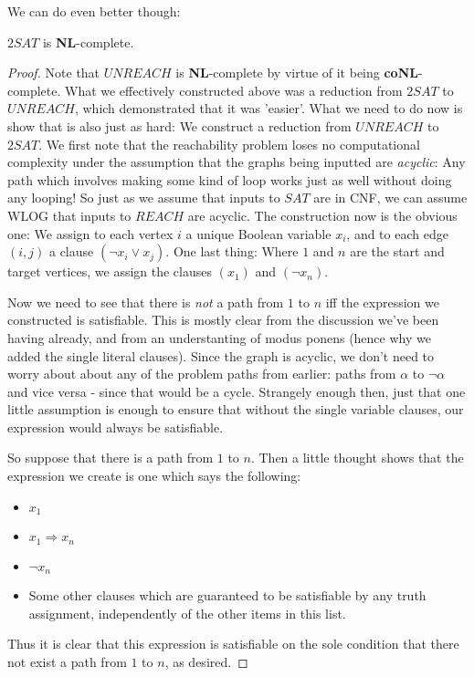 We can do even better though:
\begin{theorem}
    $2SAT$ is \textbf{NL}-complete.
\end{theorem}
\begin{proof}
    Note that $UNREACH$ is \textbf{NL}-complete by virtue of it being \textbf{coNL}-complete. What we effectively constructed above was a reduction from $2SAT$ to $UNREACH$, which demonstrated that it was 'easier'. What we need to do now is show that is also just as hard: We construct a reduction from $UNREACH$ to $2SAT$. We first note that the reachability problem loses no computational complexity under the assumption that the graphs being inputted are \textit{acyclic}: Any path which involves making some kind of loop works just as well without doing any looping! So just as we assume that inputs to $SAT$ are in CNF, we can assume WLOG that inputs to $REACH$ are acyclic. The construction now is the obvious one: We assign to each vertex $i$ a unique Boolean variable $x_i$, and to each edge $(i,j)$ a clause $(\neg x_i \vee x_j)$. One last thing: Where $1$ and $n$ are the start and target vertices, we assign the clauses $(x_1)$ and $(\neg x_n)$.
    \par Now we need to see that there is \textit{not} a path from $1$ to $n$ iff the expression we constructed is satisfiable. This is mostly clear from the discussion we've been having already, and from an understanting of modus ponens (hence why we added the single literal clauses). Since the graph is acyclic, we don't need to worry about about any of the problem paths from earlier: paths from $\alpha$ to $\neg \alpha$ and vice versa - since that would be a cycle. Strangely enough then, just that one little assumption is enough to ensure that without the single variable clauses, our expression would always be satisfiable.
    \par So suppose that there is a path from $1$ to $n$. Then a little thought shows that the expression we create is one which says the following:
        \begin{itemize}
            \item $x_1$
            \item $x_1 \Rightarrow x_n$
            \item $\neg x_n$
            \item Some other clauses which are guaranteed to be satisfiable by any truth assignment, independently of the other items in this list.
        \end{itemize}
    Thus it is clear that this expression is satisfiable on the sole condition that there not exist a path from $1$ to $n$, as desired.
\end{proof}
